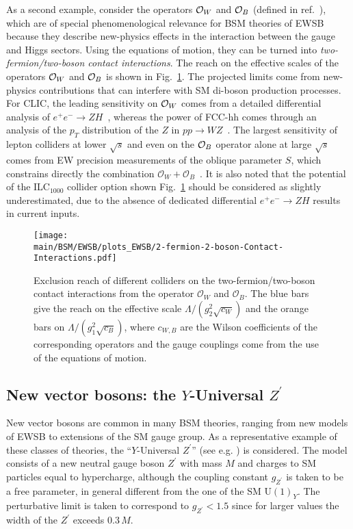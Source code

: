 \documentclass[../report.tex]{subfiles}
\providecommand{\main}{..}
\begin{document}
As a second example, consider the operators ${\cal O}_{W}$ and ${\cal O}_{B}$ (defined in ref.~\cite{Giudice:2007fh}), which are of special phenomenological relevance for BSM theories of EWSB because they describe new-physics effects in the interaction between the gauge and Higgs sectors. Using the equations of motion, they can be turned into {\it two-fermion/two-boson contact interactions}. The reach on the effective scales of the operators ${\cal O}_{W}$ and ${\cal O}_{B}$ is shown in Fig.~\ref{fig:2f2b}. The projected limits come from new-physics contributions that can interfere with SM di-boson production processes. For CLIC, the leading sensitivity on ${\cal O}_{W}$ comes from a detailed differential analysis of ${e^+e^-}\to {ZH}$~\cite{Beneke:2014sba}, whereas the power of FCC-hh comes through an analysis of the $p_T$ distribution of the $Z$ in ${pp}\to {WZ}$~\cite{Franceschini:2017xkh}. The largest sensitivity of lepton colliders at lower $\sqrt{s}$ and even on the ${\cal O}_{B}$ operator alone at large $\sqrt{s}$ comes from EW precision measurements of the oblique parameter $S$, which constrains directly the combination ${\mathcal{O}}_{W}+{\mathcal{O}}_{B}$~\cite{Giudice:2007fh}. It is also noted that the potential of the ILC$_{1000}$ collider option shown Fig.~\ref{fig:2f2b} should be considered as slightly underestimated, due to the absence of dedicated  differential ${e^+e^-}\to {ZH}$ results in current inputs.


\begin{figure}[htb]
    \centering
          \texttt{[image: \\main/BSM/EWSB/plots\_EWSB/2-fermion-2-boson-Contact-Interactions.pdf]}
    \caption{Exclusion reach of different colliders on the two-fermion/two-boson contact interactions from the operator $\mathcal{O}_{W}$ and $\mathcal{O}_{B}$. The blue bars give the reach on the effective scale $\Lambda /(g_2^2 \sqrt{c_{W}})$ and the orange bars on $\Lambda /(g_1^2 \sqrt{c_{B}})$, where $c_{W,B}$ are the Wilson coefficients of the corresponding operators and the gauge couplings come from the use of the equations of motion.}
    \label{fig:2f2b}
\end{figure}

\subsection{New vector bosons: the $Y$-Universal $Z^\prime$}

New vector bosons are common in many BSM theories, ranging from new models of EWSB to extensions of the SM gauge group. As a representative example of these classes of theories, the ``$Y$-Universal $Z^\prime$'' (see e.g. \cite{Appelquist:2002mw}) is considered. The model consists of a new neutral gauge boson $Z^\prime$ with mass $M$ and charges to SM particles equal to hypercharge, although the coupling constant $g_{Z^\prime}$ is taken to be a free parameter, in general different from the one of the SM \mbox{U$(1)_Y$}. The perturbative limit is taken to correspond to $g_{Z^\prime}<1.5$ since for larger values the width of the $Z^\prime$ exceeds $0.3\, M$.
\end{document}
